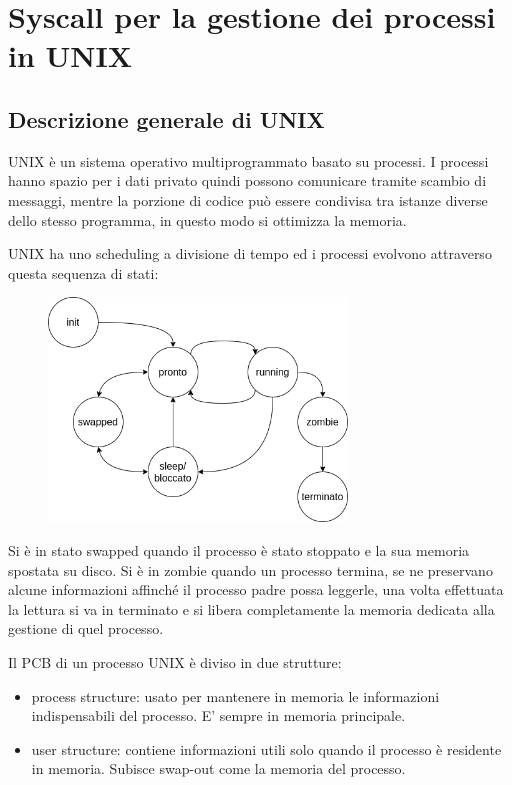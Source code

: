 \section{Syscall per la gestione dei processi in UNIX}
\subsection{Descrizione generale di UNIX}
UNIX è un sistema operativo multiprogrammato basato su processi.
I processi hanno spazio per i dati privato quindi possono comunicare tramite scambio di messaggi, mentre la porzione di codice può essere condivisa tra istanze diverse dello stesso programma, in questo modo si ottimizza la memoria.

UNIX ha uno scheduling a divisione di tempo ed i processi evolvono attraverso questa sequenza di stati:
\begin{figure}[H]
    \centering
    \includegraphics[width=300px]{images/1L_Syscall_UNIX_per_i_processi/stati_processo_unix.png}
\end{figure}
Si è in stato swapped quando il processo è stato stoppato e la sua memoria spostata su disco.
Si è in zombie quando un processo termina, se ne preservano alcune informazioni affinché il processo padre possa leggerle, una volta effettuata la lettura si va in terminato e si libera completamente la memoria dedicata alla gestione di quel processo.

Il PCB di un processo UNIX è diviso in due strutture:
\begin{itemize}
    \item process structure: usato per mantenere in memoria le informazioni indispensabili del processo.
    E' sempre in memoria principale.
    
    \item user structure: contiene informazioni utili solo quando il processo è residente in memoria.
    Subisce swap-out come la memoria del processo.
\end{itemize}

